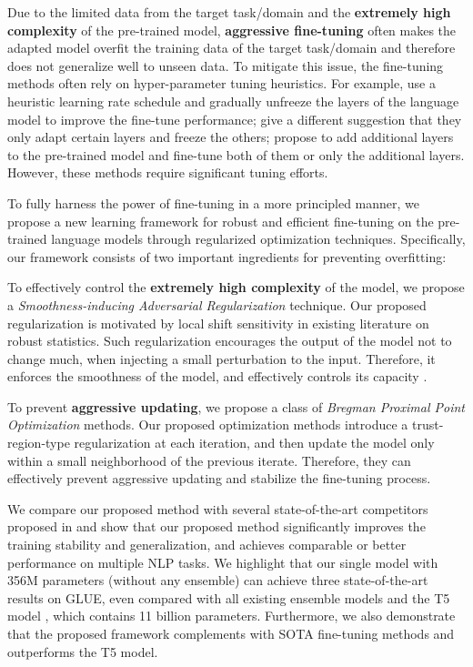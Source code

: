 \documentclass[11pt]{article} \usepackage{url}
\begin{document}
Due to the limited data from the target task/domain and the {\bf extremely high complexity} of the pre-trained model,  {\bf aggressive fine-tuning} often makes the adapted model overfit the training data of the target task/domain and therefore does not generalize well to unseen data. 
To mitigate this issue, the fine-tuning methods often rely on hyper-parameter tuning heuristics. For example, \citet{howard2018universal} use a heuristic learning rate schedule and gradually unfreeze the layers of the language model to improve the fine-tune performance; \citet{peters2019tune} give a different suggestion that they only adapt certain layers and freeze the others; \citep{houlsby2019parameter,stickland2019bert} propose to add additional layers to the pre-trained model and fine-tune both of them or only the additional layers. However, these methods require significant tuning efforts.


To fully harness the power of fine-tuning in a more principled manner, we propose a new learning framework for robust and efficient fine-tuning on the pre-trained language models through regularized optimization techniques. Specifically, our framework consists of two important ingredients for preventing overfitting: 

 To effectively control the {\bf extremely high complexity} of the model, we propose a {\it Smoothness-inducing Adversarial Regularization} technique. Our proposed regularization is motivated by local shift sensitivity in existing literature on robust statistics. Such regularization encourages the output of the model not to change much, when injecting a small perturbation to the input. Therefore, it enforces the smoothness of the model, and effectively controls its capacity \cite{mohri2018foundations}.

 To prevent {\bf aggressive updating}, we propose a class of {\it Bregman Proximal Point Optimization} methods. Our proposed optimization methods introduce a trust-region-type regularization \citep{conn2000trust} at each iteration, and then update the model only within a small neighborhood of the previous iterate. Therefore, they can effectively prevent aggressive updating and stabilize the fine-tuning process.

We compare our proposed method with several state-of-the-art competitors proposed in \cite{zhu2019freelb,liu2019mt-dnn,liu2019roberta,lan2019albert,raffel2019t5} and show that our proposed method significantly improves the training stability and generalization, and achieves comparable or better performance on multiple NLP tasks. We highlight that our single model with 356M parameters (without any ensemble) can achieve three state-of-the-art results on GLUE, even compared with all existing ensemble models and the T5 model \cite{raffel2019t5}, which contains 11 billion parameters. Furthermore, we also demonstrate that the proposed framework complements with SOTA fine-tuning methods \cite{liu2019mt-dnn} and outperforms the T5 model.
\end{document}
